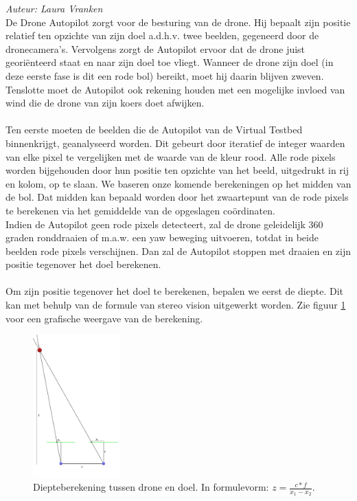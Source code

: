 {\em Auteur: Laura Vranken}\\

\noindent
De Drone Autopilot zorgt voor de besturing van de drone. Hij bepaalt zijn positie relatief ten opzichte van zijn doel a.d.h.v. twee beelden, gegeneerd door de dronecamera's. Vervolgens zorgt de Autopilot ervoor dat de drone juist geori\"enteerd staat en naar zijn doel toe vliegt. Wanneer de drone zijn doel (in deze eerste fase is dit een rode bol) bereikt, moet hij daarin blijven zweven. Tenslotte moet de Autopilot ook rekening houden met een mogelijke invloed van wind die de drone van zijn koers doet afwijken.
\\
\\
Ten eerste moeten de beelden die de Autopilot van de Virtual Testbed binnenkrijgt, geanalyseerd worden. Dit gebeurt door iteratief de integer waarden van elke pixel te vergelijken met de waarde van de kleur rood. Alle rode pixels worden bijgehouden door hun positie ten opzichte van het beeld, uitgedrukt in rij en kolom, op te slaan. We baseren onze komende berekeningen op het midden van de bol. Dat midden kan bepaald worden door het zwaartepunt van de rode pixels te berekenen via het gemiddelde van de opgeslagen co\"ordinaten.
\\
Indien de Autopilot geen rode pixels detecteert, zal de drone geleidelijk 360 graden ronddraaien of m.a.w. een yaw beweging uitvoeren, totdat in beide beelden rode pixels verschijnen. Dan zal de Autopilot stoppen met draaien en zijn positie tegenover het doel berekenen.
\\
\\
Om zijn positie tegenover het doel te berekenen, bepalen we eerst de diepte. Dit kan met behulp van de formule van stereo vision \cite{website:techbriefs} uitgewerkt worden. Zie figuur \ref{fig:DiepteberekeningDroneEnDoel} voor een grafische weergave van de berekening.
\begin{figure}[h]
	\centering
	\includegraphics[width=0.3\textwidth]{DiepteberekeningDroneEnDoel.png}
	\caption{Diepteberekening tussen drone en doel. In formulevorm: \(z = \frac{c * f}{x_1 - x_2}\).}
	\label{fig:DiepteberekeningDroneEnDoel}
\end{figure}
